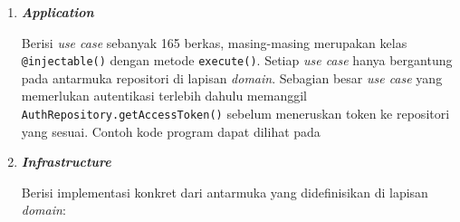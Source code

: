 \begin{enumerate}[listparindent=1cm]
\begin{enumerate}[listparindent=1cm, label=\alph*.]
                        \begin{itemize}
                              \item Entitas sebanyak 39 kelas yang merepresentasikan objek bisnis seperti \texttt{User}, \texttt{Team}, \texttt{Achievement}, \texttt{Competition}, \texttt{CoreTeam}, \texttt{FundApplication}, dan lainnya. Contoh kode program dapat dilihat pada 
                              \item Antarmuka repositori sebanyak 37 berkas yang mendefinisikan kontrak operasi CRUD untuk setiap entitas. Contoh kode program dapat dilihat pada 
                              \item Kelas kesalahan HTTP dengan kelas dasar \texttt{HttpError} dan turunan seperti \texttt{BadRequestError}, \texttt{UnauthorizedError}, \texttt{ForbiddenError}, \texttt{NotFoundError}, \texttt{ValidationError}, dan \texttt{InternalServerError}. Contoh kode program dapat dilihat pada 
                        \end{itemize}

                  \item \textbf{\textit{Application}}

                        Berisi \textit{use case} sebanyak 165 berkas, masing-masing merupakan kelas \texttt{@injectable()} dengan metode \texttt{execute()}. Setiap \textit{use case} hanya bergantung pada antarmuka repositori di lapisan \textit{domain}. Sebagian besar \textit{use case} yang memerlukan autentikasi terlebih dahulu memanggil \texttt{AuthRepository.getAccessToken()} sebelum meneruskan token ke repositori yang sesuai. Contoh kode program dapat dilihat pada 

                  \item \textbf{\textit{Infrastructure}}

                        Berisi implementasi konkret dari antarmuka yang didefinisikan di lapisan \textit{domain}:


\end{enumerate}
\end{enumerate}
